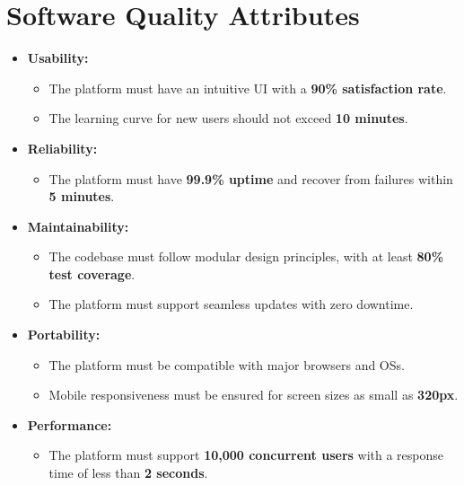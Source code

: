 \documentclass[a4paper, 11pt]{scrreprt}
\begin{document}
\section{Software Quality Attributes}
\begin{itemize}
    \item \textbf{Usability:}
    \begin{itemize}
        \item The platform must have an intuitive UI with a \textbf{90\% satisfaction rate}.
        \item The learning curve for new users should not exceed \textbf{10 minutes}.
    \end{itemize}

    \item \textbf{Reliability:}
    \begin{itemize}
        \item The platform must have \textbf{99.9\% uptime} and recover from failures within \textbf{5 minutes}.
    \end{itemize}

    \item \textbf{Maintainability:}
    \begin{itemize}
        \item The codebase must follow modular design principles, with at least \textbf{80\% test coverage}.
        \item The platform must support seamless updates with zero downtime.
    \end{itemize}

    \item \textbf{Portability:}
    \begin{itemize}
        \item The platform must be compatible with major browsers and OSs.
        \item Mobile responsiveness must be ensured for screen sizes as small as \textbf{320px}.
    \end{itemize}

    \item \textbf{Performance:}
    \begin{itemize}
        \item The platform must support \textbf{10,000 concurrent users} with a response time of less than \textbf{2 seconds}.
    \end{itemize}
\end{itemize}
\end{document}
